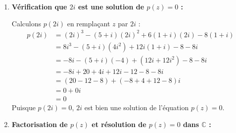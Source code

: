 \documentclass[12pt,a4paper]{article}
\begin{document}
\begin{enumerate}
    \item \textbf{Vérification que $2i$ est une solution de $p(z) = 0$ :}
    
    Calculons $p(2i)$ en remplaçant $z$ par $2i$ :
    $$
    \begin{aligned}
        p(2i) &= (2i)^3 - (5 + i)(2i)^2 + 6(1 + i)(2i) - 8(1 + i) \\
        &= 8i^3 - (5 + i)(4i^2) + 12i(1 + i) - 8 - 8i \\
        &= -8i - (5 + i)(-4) + (12i + 12i^2) - 8 - 8i \\
        &= -8i + 20 + 4i + 12i - 12 - 8 - 8i \\
        &= (20 - 12 - 8) + (-8 + 4 + 12 - 8)i \\
        &= 0 + 0i \\
        &= 0
    \end{aligned}
    $$
    Puisque $p(2i) = 0$, $2i$ est bien une solution de l'équation $p(z) = 0$.

    \item \textbf{Factorisation de $p(z)$ et résolution de $p(z) = 0$ dans $\mathbb{C}$ :}
    

\end{enumerate}
\end{document}
